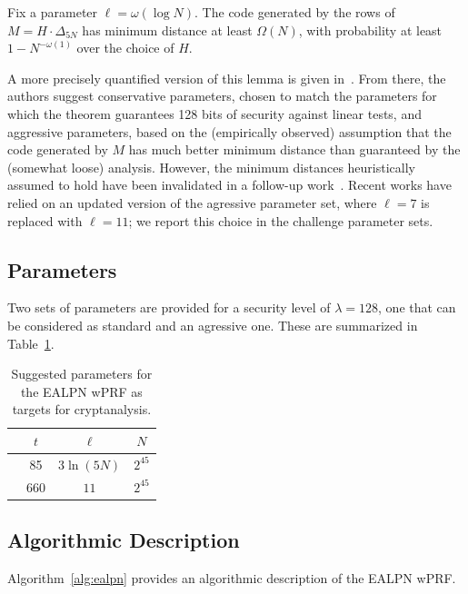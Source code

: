 \documentclass[journal=tosc,submission]{iacrtrans}
\theoremstyle{theorem}
\begin{document}
\begin{lemma}
Fix a parameter $\ell = \omega(\log N)$. The code generated by the rows of  $M = H \cdot \Delta_{5N}$ has minimum distance at least $\Omega(N)$, with probability at least $1 - N^{-\omega(1)}$ over the choice of $H$.
\end{lemma}

A more precisely quantified version of this lemma is given in~\cite[Theorem 3.10]{C:BCGIKR22}. From there, the authors suggest conservative parameters, chosen to match the parameters for which the theorem guarantees 128 bits of security against linear tests, and aggressive parameters, based on the (empirically observed) assumption that the code generated by $M$ has much better minimum distance than guaranteed by the (somewhat loose) analysis. However, the minimum distances heuristically assumed to hold have been invalidated in a follow-up work~\cite{C:RagRinTan23}. Recent works have relied on an updated version of the agressive parameter set, where $\ell=7$ is replaced with $\ell=11$; we report this choice in the challenge parameter sets.

\subsection{Parameters}

Two sets of parameters are provided for a security level of $\lambda = 128$, one that can be considered as standard and an agressive one. These are summarized in Table~\ref{tab:parameters_ealpn}.

\begin{table}[!ht]
\centering
\begin{tabular}{lccc}
\toprule
& $t$ & $\ell$ & $N$ \\
\midrule
&85 & $3\ln(5N)$ & $2^{45}$ \\ 
&660 & $11$ & $2^{45}$ \\ 
\bottomrule
\end{tabular}
\caption{\label{tab:parameters_ealpn}Suggested parameters for the {\sf EALPN} wPRF as targets for cryptanalysis.}
\end{table}


\subsection{Algorithmic Description}

Algorithm~\ref{alg:ealpn} provides an algorithmic description of the {\sf EALPN} wPRF.
\end{document}
